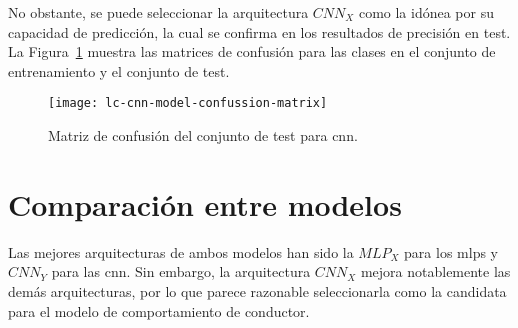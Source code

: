 
No obstante, se puede seleccionar la arquitectura $CNN_X$ como la idónea por su capacidad de predicción, la cual se confirma en los resultados de precisión en test. La Figura~\ref{fig:lc-cnn-model-confussion-matrix} muestra las matrices de confusión para las clases en el conjunto de entrenamiento y el conjunto de test.

\begin{figure}
	\centering
	\texttt{[image: lc-cnn-model-confussion-matrix]}
	\caption[Matriz de confusión del conjunto de test para \ac{cnn}]{Matriz de confusión del conjunto de test para \ac{cnn}.}
	\label{fig:lc-cnn-model-confussion-matrix}
\end{figure}

\section{Comparación entre modelos}

Las mejores arquitecturas de ambos modelos han sido la $MLP_X$ para los \acp{mlp} y $CNN_Y$ para las \ac{cnn}. Sin embargo, la arquitectura $CNN_X$ mejora notablemente las demás arquitecturas, por lo que parece razonable seleccionarla como la candidata para el modelo de comportamiento de conductor.